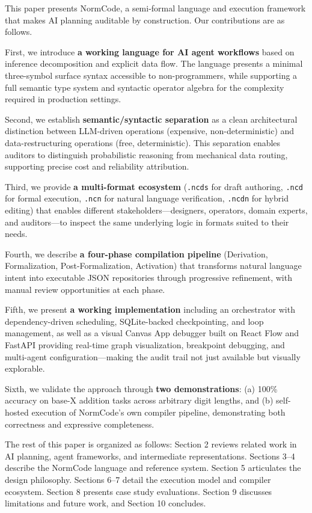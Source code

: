 This paper presents NormCode, a semi-formal language and execution framework that makes AI planning auditable by construction. Our contributions are as follows.

First, we introduce \textbf{a working language for AI agent workflows} based on inference decomposition and explicit data flow. The language presents a minimal three-symbol surface syntax accessible to non-programmers, while supporting a full semantic type system and syntactic operator algebra for the complexity required in production settings.

Second, we establish \textbf{semantic/syntactic separation} as a clean architectural distinction between LLM-driven operations (expensive, non-deterministic) and data-restructuring operations (free, deterministic). This separation enables auditors to distinguish probabilistic reasoning from mechanical data routing, supporting precise cost and reliability attribution.

Third, we provide \textbf{a multi-format ecosystem} (\texttt{.ncds} for draft authoring, \texttt{.ncd} for formal execution, \texttt{.ncn} for natural language verification, \texttt{.ncdn} for hybrid editing) that enables different stakeholders---designers, operators, domain experts, and auditors---to inspect the same underlying logic in formats suited to their needs.

Fourth, we describe \textbf{a four-phase compilation pipeline} (Derivation, Formalization, Post-Formalization, Activation) that transforms natural language intent into executable JSON repositories through progressive refinement, with manual review opportunities at each phase.

Fifth, we present \textbf{a working implementation} including an orchestrator with dependency-driven scheduling, SQLite-backed checkpointing, and loop management, as well as a visual Canvas App debugger built on React Flow and FastAPI providing real-time graph visualization, breakpoint debugging, and multi-agent configuration---making the audit trail not just available but visually explorable.

Sixth, we validate the approach through \textbf{two demonstrations}: (a) 100\% accuracy on base-X addition tasks across arbitrary digit lengths, and (b) self-hosted execution of NormCode's own compiler pipeline, demonstrating both correctness and expressive completeness.

The rest of this paper is organized as follows: Section 2 reviews related work in AI planning, agent frameworks, and intermediate representations. Sections 3--4 describe the NormCode language and reference system. Section 5 articulates the design philosophy. Sections 6--7 detail the execution model and compiler ecosystem. Section 8 presents case study evaluations. Section 9 discusses limitations and future work, and Section 10 concludes.
